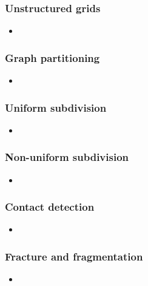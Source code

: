 %
%
%
%


\begin{frame}[fragile]
%
  \frametitle{Unstructured grids}
%
  \begin{itemize}
%
  \item 
%
  \end{itemize}
%
\end{frame}

\begin{frame}[fragile]
%
  \frametitle{Graph partitioning}
%
  \begin{itemize}
%
  \item 
%
  \end{itemize}
%
\end{frame}

\begin{frame}[fragile]
%
  \frametitle{Uniform subdivision}
%
  \begin{itemize}
%
  \item 
%
  \end{itemize}
%
\end{frame}

\begin{frame}[fragile]
%
  \frametitle{Non-uniform subdivision}
%
  \begin{itemize}
%
  \item 
%
  \end{itemize}
%
\end{frame}

\begin{frame}[fragile]
%
  \frametitle{Contact detection}
%
  \begin{itemize}
%
  \item 
%
  \end{itemize}
%
\end{frame}

\begin{frame}[fragile]
%
  \frametitle{Fracture and fragmentation}
%
  \begin{itemize}
%
  \item 
%
  \end{itemize}
%
\end{frame}

